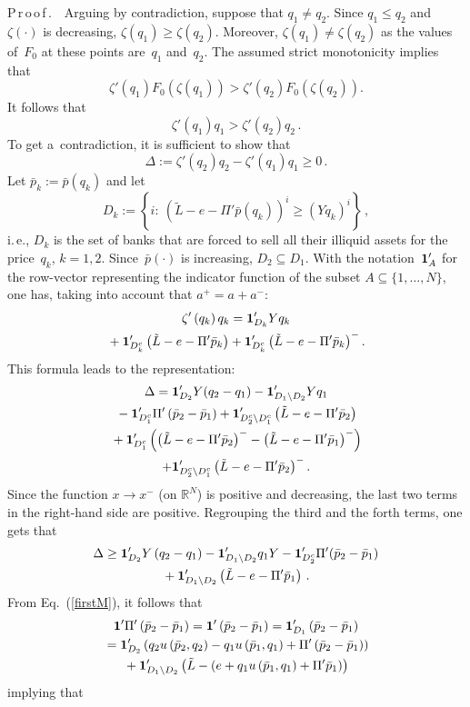 \begin{multicols}{2}
\noindent
P\,r\,o\,o\,f\,.\ \
Arguing by contradiction, suppose that  $q_1\neq q_2$.     Since $q_1\le q_2$ 
and $\zeta(\cdot)$ is decreasing,   $\zeta(q_1)\ge \zeta(q_2)$. Moreover, 
$\zeta(q_1)\neq \zeta(q_2)$ as the values of~$F_0$ at these points are~$q_1$ 
and~$q_2$.
 The assumed strict monotonicity  implies that
 $$
 \zeta'(q_1)F_0( \zeta(q_1))> \zeta'(q_2)F_0( \zeta(q_2)).
 $$
It follows that
$$
\zeta'\left(q_1\right) q_1> \zeta'\left(q_2\right)q_2\,.
 $$
To get a~contradiction, it is sufficient to show that
$$
\Delta:= \zeta'\left(q_2\right)q_2-\zeta'\left(q_1\right)q_1\ge 0\,.
$$
Let $\bar p_k:=\bar p(q_k)$ and let
$$
D_k:=\left\{i:\ \left(\tilde L-e-\Pi'\bar p\left(q_k\right)\right)^i\ge 
\left(Yq_k\right)^i\right\}\,,
$$
i.\,e., $D_k$ is the set of banks that are forced to sell all their illiquid assets 
for the price~$q_k$, $k=1,2$. Since~$\bar p(\cdot)$ is increasing, $D_2\subseteq D_1$.  
With the 
notation~${\bf 1}'_{A}$ for the row-vector representing the indicator function
of the subset $A\subseteq \{1,\dots, N\}$, one has, taking into account that 
$a^+=a+a^-$:
\begin{multline*}
\zeta'\left(q_k\right)q_k={\bf 1}'_{D_k}Yq_k\\
{}+{\bf 1}'_{D_k^c}\left(\tilde L-e-\Pi'\bar 
p_k\right)+{\bf 1}'_{D_k^c}\left(\tilde L-e-\Pi'\bar p_k\right)^-.
\end{multline*}
This formula leads to the representation:
\begin{multline*}
\Delta={\bf 1}'_{D_2}Y(q_2-q_1)-{\bf 1}'_{D_1\setminus D_2}Yq_1\\
{}- {\bf 1}'_{D_1^c}
\Pi'\left(\bar p_2-  \bar p_1\right)+{\bf 1}'_{D_2^c\setminus D_1^c}
\left(\tilde L-e -\Pi'\bar p_2\right)\\
{}+ {\bf 1}'_{D_1^c}\left(\left(\tilde L-e -\Pi'\bar p_2\right)^- -
\left(\tilde L-e -\Pi'\bar p_1\right)^-\right)\\
+
{\bf 1}'_{D_2^c\setminus D_1^c}\left(\tilde L-e -\Pi'\bar p_2\right)^-.
\end{multline*}
Since the function $x\to x^-$ (on ${\mathbb{R}}^N$) is positive and decreasing, the 
last two terms in the right-hand side are positive. Regrouping  the third and 
the forth  terms, one gets that
\begin{multline}
\label{ineq1}
\Delta\ge{\bf 1}'_{D_2}Y\left(q_2-q_1\right)-{\bf 1}'_{D_1\setminus D_2}q_1Y
- {\bf 1}'_{D_2^c}\Pi'(\bar p_2-
 \bar p_1)\\
 {}+{\bf 1}'_{D_1\setminus D_2}\left(\tilde L-e -\Pi'\bar p_1\right)\,.
\end{multline}
From Eq.~(\ref{firstM}), it follows that
\begin{multline*}
{\bf 1}'\Pi'\left(\bar p_2-  \bar p_1\right)=
{\bf 1}'\left(\bar p_2-  \bar p_1\right)={\bf 1}'_{D_1}\left(\bar p_2-  \bar p_1\right)\\
{}={\bf 1}'_{D_2}\left(q_2u\left(\bar p_2,q_2\right)-q_1u
\left(\bar p_1,q_1\right)+\Pi'\left(\bar p_2-  \bar p_1\right)\right)\\
{}+{\bf 1}'_{D_1\setminus D_2}\left(\tilde L -\left(e+q_1u\left(\bar p_1,q_1
\right) +\Pi'\bar p_1\right)\right)
\end{multline*}
implying that


\end{multicols}
